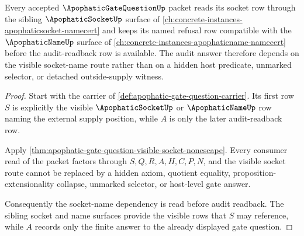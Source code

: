 \begin{theorem}
\label{thm:apophatic-gate-question-socket-name-dependency}
Every accepted $\ApophaticGateQuestionUp$ packet reads its socket row through the sibling $\ApophaticSocketUp$ surface of \autoref{ch:concrete-instances-apophaticsocket-namecert} and keeps its named refusal row compatible with the $\ApophaticNameUp$ surface of \autoref{ch:concrete-instances-apophaticname-namecert} before the audit-readback row is available. The audit answer therefore depends on the visible socket-name route rather than on a hidden host predicate, unmarked selector, or detached outside-supply witness.
\end{theorem}
\begin{proof}
Start with the carrier of \autoref{def:apophatic-gate-question-carrier}. Its first row $S$ is explicitly the visible $\ApophaticSocketUp$ or $\ApophaticNameUp$ row naming the external supply position, while $A$ is only the later audit-readback row.

Apply \autoref{thm:apophatic-gate-question-visible-socket-nonescape}. Every consumer read of the packet factors through $S,Q,R,A,H,C,P,N$, and the visible socket route cannot be replaced by a hidden axiom, quotient equality, proposition-extensionality collapse, unmarked selector, or host-level gate answer.

Consequently the socket-name dependency is read before audit readback. The sibling socket and name surfaces provide the visible rows that $S$ may reference, while $A$ records only the finite answer to the already displayed gate question.
\end{proof}

